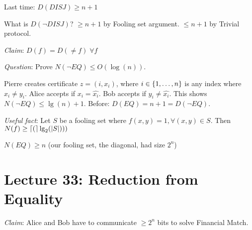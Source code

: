 Last time: $D(DISJ) \geq n + 1$

What is $D(\neg DISJ)$? $\geq n + 1$ by Fooling set argument. $\leq n + 1$ by Trivial protocol.

\emph{Claim}: $D(f) = D(\neq f) \; \forall f$

\emph{Question}: Prove $N(\neg EQ) \leq O(\log(n))$.

Pierre creates certificate $z = (i, x_i)$, where $i \in \left \{ 1, \ldots, n \right \}$ is any index where $x_i \neq y_i$. Alice accepts if $x_i = \hat{x_i}$. Bob accepts if $y_i \neq \hat{x_i}$. This shows $N(\neg EQ) \leq \lg(n) + 1$. Before: $D(EQ) = n + 1 = D(\neg EQ)$.

\emph{Useful fact}: Let $S$ be a fooling set  where $f(x, y) = 1, \forall (x, y) \in S$. Then $N(f) \geq \left \lceil ( \right \rceil\lg_2(\left | S \right |)))$

\begin{example}
    $N(EQ) \geq n$ (our fooling set, the diagonal, had size $2^n$)
\end{example}

\section*{Lecture 33: Reduction from Equality}

\emph{Claim}: Alice and Bob have to communicate $\geq 2^n$ bits to solve Financial Match.

